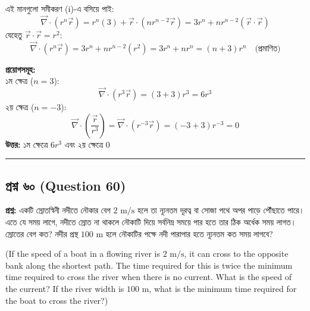 \documentclass[12pt]{article}
\begin{document}
এই মানগুলো সমীকরণ (i)-এ বসিয়ে পাই:
$$\vec{\nabla} \cdot (r^n \vec{r}) = r^n(3) + \vec{r} \cdot (n r^{n-2} \vec{r}) = 3r^n + n r^{n-2}(\vec{r} \cdot \vec{r})$$
যেহেতু $\vec{r} \cdot \vec{r} = r^2$:
$$\vec{\nabla} \cdot (r^n \vec{r}) = 3r^n + n r^{n-2}(r^2) = 3r^n + n r^n = (n+3)r^n \quad \text{(প্রমাণিত)}$$

\textbf{প্রয়োগসমূহ:} \\
১ম ক্ষেত্র ($n=3$):
$$\vec{\nabla} \cdot (r^3 \vec{r}) = (3+3)r^3 = 6r^3$$
২য় ক্ষেত্র ($n=-3$):
$$\vec{\nabla} \cdot \left(\frac{\vec{r}}{r^3}\right) = \vec{\nabla} \cdot (r^{-3} \vec{r}) = (-3+3)r^{-3} = 0$$
\textbf{উত্তর:} ১ম ক্ষেত্রে $6r^3$ এবং ২য় ক্ষেত্রে $0$

\vspace{0.8cm}

\noindent\rule{\textwidth}{1pt}
\subsection*{প্রশ্ন ৬০ (Question 60)}

\textbf{প্রশ্ন:} একটি স্রোতস্বিনী নদীতে নৌকার বেগ $2\text{ m/s}$ হলে তা ন্যূনতম দূরত্ব বা সোজা পথে অপর পাড়ে পৌঁছাতে পারে। এতে যে সময় লাগে, নদীতে স্রোত না থাকলে নৌকাটি দিয়ে সর্বনিম্ন সময়ে পার হতে তার ঠিক অর্ধেক সময় লাগত। স্রোতের বেগ কত? নদীর প্রস্থ $100\text{ m}$ হলে নৌকাটির পক্ষে নদী পারাপার হতে ন্যূনতম কত সময় লাগবে?

(If the speed of a boat in a flowing river is $2\text{ m/s}$, it can cross to the opposite bank along the shortest path. The time required for this is twice the minimum time required to cross the river when there is no current. What is the speed of the current? If the river width is $100\text{ m}$, what is the minimum time required for the boat to cross the river?)

\begin{center}
\end{center}
\end{document}
